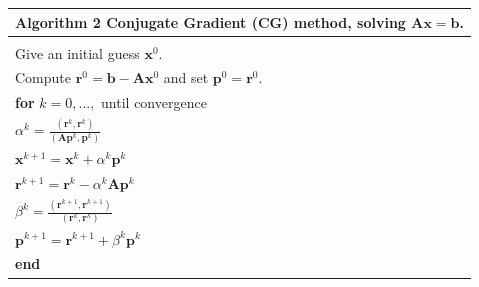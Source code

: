 \documentclass[review]{elsarticle}
\begin{document}
 \begin{table}[!h]
\begin{tabular}{ |l| } 
\hline
  \textbf{Algorithm 2} Conjugate Gradient (CG) method, solving $\mathbf{A}\mathbf{x}=\mathbf{b}$.\\
  \hline
 \hline
\\
Give an initial guess $\mathbf{x}^0$. \\Compute $\mathbf{r}^0=\mathbf{b}-\mathbf{A}\mathbf{x}^0$ and set $\mathbf{p}^0=\mathbf{r}^0$.\\

\hspace{0.5cm}\textbf{for} $k=0,...,$ until convergence\\
 \hspace{1cm} $\alpha^k=\frac{(\mathbf{r}^{k},\mathbf{r}^{k})}{(\mathbf{A}\mathbf{p}^k,\mathbf{p}^k)}$\\
\hspace{1cm} $\mathbf{x}^{k+1}=\mathbf{x}^k+\alpha^k\mathbf{p}^k$\\
\hspace{1cm}$\mathbf{r}^{k+1}=\mathbf{r}^k-\alpha^k\mathbf{A}\mathbf{p}^k$\\
\hspace{1cm}$ \beta^k=\frac{(\mathbf{r}^{k+1},\mathbf{r}^{k+1})}{(\mathbf{r}^k,\mathbf{r}^k)}$\\
\hspace{1cm}$\mathbf{p}^{k+1}=\mathbf{r}^{k+1}+\beta^k\mathbf{p}^k$\\
\hspace{0.5cm}\textbf{end}\\
\hline
\end{tabular}
\end{table}
\end{document}
